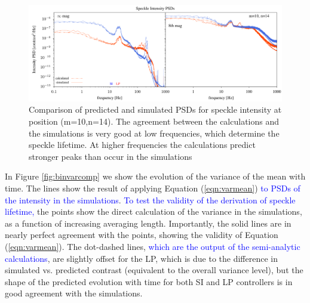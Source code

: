 \documentclass[10pt,preprint]{aastex631}
\newcommand{\jrmadd}[1]{\textcolor{blue}{#1}}
\begin{document}
\begin{figure}
\hspace{-0.3in}
\includegraphics[width=6.5in]{spPsdComp_lp_10_14.pdf}
\caption{Comparison of predicted and simulated PSDs for speckle intensity at position (m=10,n=14).  The agreement between the calculations and the simulations is very good at low frequencies, which determine the speckle lifetime.  At higher frequencies the calculations predict stronger peaks than occur in the simulations  \label{fig:sppsdcomp}}
\end{figure}

In Figure \ref{fig:binvarcomp} we show the evolution of the variance of the mean with time.  The lines show the result of applying Equation (\ref{eqn:varmean})  \jrmadd{to PSDs of the intensity in the simulations}. \jrmadd{To test the validity of the derivation of speckle lifetime,} the points show the direct calculation of the variance in the simulations, as a function of increasing averaging length.   Importantly, the solid lines are in nearly perfect agreement with the points, showing the validity of Equation (\ref{eqn:varmean}).  The dot-dashed lines, \jrmadd{which are the output of the semi-analytic calculations}, are slightly offset for the LP, which is due to the difference in simulated vs. predicted contrast (equivalent to the overall variance level), but the shape of the predicted evolution with time for both SI and LP controllers is in good agreement with the simulations.
\end{document}
